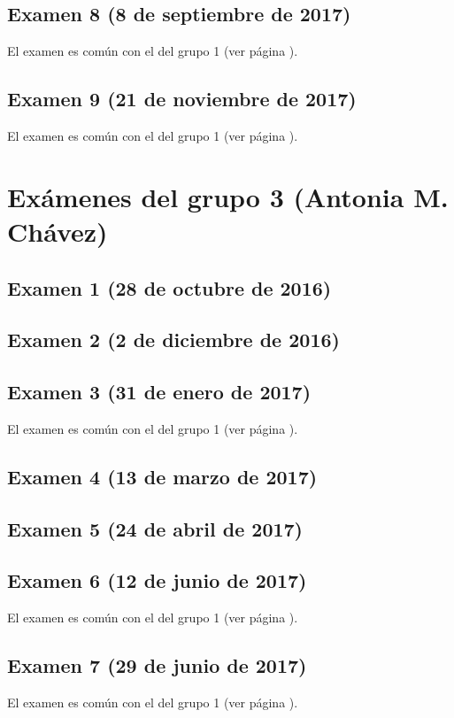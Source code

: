 \documentclass[a4paper,12pt,twoside]{book}
\begin{document}
\subsection{Examen 8 (8 de septiembre de 2017)}
El examen es común con el del grupo 1 (ver página \pageref{examen_16_17_4_8}).
\subsection{Examen 9 (21 de noviembre de 2017)}
El examen es común con el del grupo 1 (ver página \pageref{examen_16_17_4_9}).

\section{Exámenes del grupo 3 (Antonia M. Chávez)}
\subsection{Examen 1 (28 de octubre de 2016)}
\subsection{Examen 2 (2 de diciembre de 2016)}
\subsection{Examen 3 (31 de enero de 2017)}
El examen es común con el del grupo 1 (ver página \pageref{examen_16_17_1_3}).
\subsection{Examen 4 (13 de marzo de 2017)}
\subsection{Examen 5 (24 de abril de 2017)}
\subsection{Examen 6 (12 de junio de 2017)}
El examen es común con el del grupo 1 (ver página \pageref{examen_16_17_1_6}).
\subsection{Examen 7 (29 de junio de 2017)}
El examen es común con el del grupo 1 (ver página \pageref{examen_16_17_4_7}).
\end{document}
